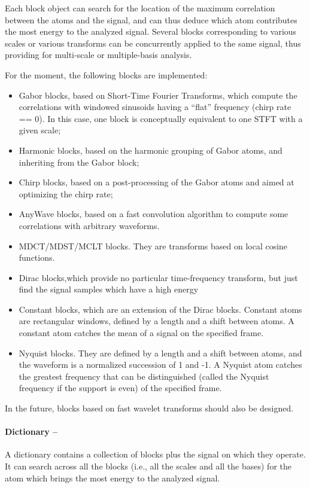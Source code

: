 \documentclass[11pt,a4paper]{article}
\begin{document}
Each block object can search for the location of the maximum correlation
between the atoms and the signal, and can thus deduce which atom contributes
the most energy to the analyzed signal. Several blocks corresponding to various
scales or various transforms can be concurrently applied to the same signal,
thus providing for multi-scale or multiple-basis analysis.

For the moment, the following blocks are implemented:
\begin{itemize}
\item Gabor blocks, based on Short-Time Fourier Transforms, which compute the
  correlations with windowed sinusoids having a ``flat'' frequency (chirp rate
  == 0). In this case, one block is conceptually equivalent to one STFT with a
  given scale;
\item Harmonic blocks, based on the harmonic grouping of Gabor atoms, and
  inheriting from the Gabor block;
\item Chirp blocks, based on a post-processing of the Gabor atoms and aimed at
  optimizing the chirp rate;
\item AnyWave blocks, based on a fast convolution algorithm to compute some
  correlations with arbitrary waveforms.
\item MDCT/MDST/MCLT blocks. They are transforms based on local cosine functions.
\item Dirac blocks,which provide no particular time-frequency
  transform, but just find the signal samples which have a high
  energy
\item Constant blocks, which are an extension of the Dirac blocks.
  Constant atoms are rectangular windows, defined by a length and a
  shift between atoms. A constant atom catches the mean of a signal on
  the specified frame.
\item Nyquist blocks. They are defined by a length and a shift between
  atoms, and the waveform is a normalized succession of 1 and -1. A
  Nyquist atom catches the greatest frequency that can be
  distinguished (called the Nyquist frequency if the support is even)
  of the specified frame.
\end{itemize}
In the future, blocks based on fast wavelet transforms should also be designed.

\paragraph{Dictionary --} A dictionary contains a collection of blocks plus
the signal on which they operate. It can search across all the blocks (i.e.,
all the scales and all the bases) for the atom which brings the most energy to
the analyzed signal.
\end{document}
